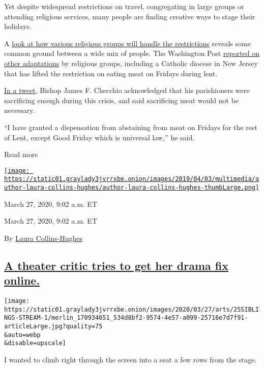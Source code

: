 Yet despite widespread restrictions on travel, congregating in large
groups or attending religious services, many people are finding creative
ways to stage their holidays.

A
\href{https://www.nytimes3xbfgragh.onion/2020/03/27/dining/holidays-coronavirus.html}{look
at how various religious groups will handle the restrictions} reveals
some common ground between a wide mix of people. The Washington Post
\href{https://www.washingtonpost.com/nation/2020/03/27/coronavirus-lent-meat/}{reported
on other adaptations} by religious groups, including a Catholic diocese
in New Jersey that has lifted the restriction on eating meat on Fridays
during lent.

\href{https://twitter.com/diocesemetuchen/status/1243227989250359298}{In
a tweet}, Bishop James F. Checchio acknowledged that his parishioners
were sacrificing enough during this crisis, and said sacrificing meat
would not be necessary.

``I have granted a dispensation from abstaining from meat on Fridays for
the rest of Lent, except Good Friday which is universal law,'' he said.

Read more

\href{https://www.nytimes3xbfgragh.onion/by/laura-collins-hughes}{\texttt{[image: https://static01.graylady3jvrrxbe.onion/images/2019/04/03/multimedia/author-laura-collins-hughes/author-laura-collins-hughes-thumbLarge.png]}}

March 27, 2020, 9:02 a.m. ET

March 27, 2020, 9:02 a.m. ET

By
\href{https://www.nytimes3xbfgragh.onion/by/laura-collins-hughes}{Laura
Collins-Hughes}

\hypertarget{a-theater-critic-tries-to-get-her-drama-fix-online}{%
\subsection{\texorpdfstring{\protect\hyperlink{a-theater-critic-tries-to-get-her-drama-fix-online}{A
theater critic tries to get her drama fix
online.}}{A theater critic tries to get her drama fix online.}}\label{a-theater-critic-tries-to-get-her-drama-fix-online}}

\texttt{[image: https://static01.graylady3jvrrxbe.onion/images/2020/03/27/arts/25SIBLINGS-STREAM-1/merlin\_170934651\_534d8bf2-9574-4e57-a099-25716e7d7f91-articleLarge.jpg?quality=75\\\&auto=webp\\\&disable=upscale]}

I wanted to climb right through the screen into a seat a few rows from
the stage.

